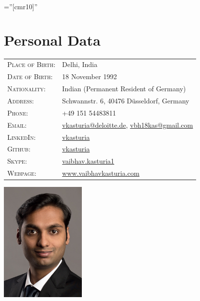 \documentclass[a4paper,10pt]{article} %
\begin{document}
\pagestyle{empty} %
\font\fb=''[cmr10]'' %


\par{\bigskip\par} %

\section{Personal Data}

\begin{minipage}[b][4.5cm][t]{0.5\textwidth}
\begin{tabular}{ll}
\textsc{Place of Birth:} & Delhi, India \\ 
\textsc{Date of Birth:} & 18 November 1992 \\
\textsc{Nationality:} & Indian (Permanent Resident of Germany)\\
\textsc{Address:} & Schwannstr. 6, 40476 Düsseldorf, Germany \\
\textsc{Phone:} &  +49 151 54483811\\
\textsc{Email:} & \href{mailto:vkasturia@deloitte.de}{vkasturia@deloitte.de}, \href{mailto:vbh18kas@gmail.com}{vbh18kas@gmail.com} \\
\textsc{LinkedIn:} & \href{https://www.linkedin.com/in/vkasturia/}{vkasturia} \\
\textsc{Github:} & \href{https://github.com/vkasturia}{vkasturia} \\
\textsc{Skype:} & \href{https://join.skype.com/invite/apwT2EQ6iqFR}{vaibhav.kasturia1} \\
\textsc{Webpage:} & \href{https://www.vaibhavkasturia.com}{www.vaibhavkasturia.com}
\end{tabular}
\end{minipage}
\begin{minipage}[b][4.5cm][t]{0.5\textwidth}
\hspace{3.5cm}
\includegraphics[width=0.32\textwidth]{./bewerbungsbild_cropped.jpg}
\end{minipage}
\end{document}
